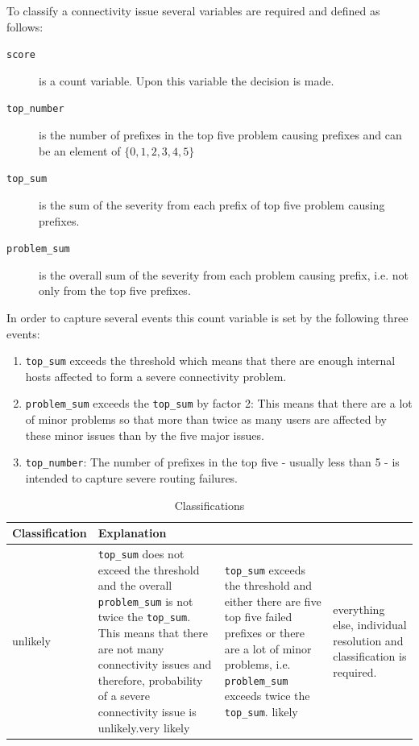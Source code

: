 To classify a connectivity issue several variables are required and defined as
follows:
\begin{description}
	\item[\texttt{score}] is a count variable. Upon this
	variable the decision is made.
	\item[\texttt{top\_number}] is the number of prefixes in the top five problem
	causing prefixes and can be an element of $\{0,1,2,3,4,5\}$
	\item[\texttt{top\_sum}] is the sum of the severity from each prefix of top five
	problem causing prefixes.
	\item[\texttt{problem\_sum}] is the overall sum of the severity from each
	problem causing prefix, i.e. not only from the top five prefixes.
\end{description}
In order to capture several events this count variable is set
by the following three events:
\begin{enumerate}
	\item \texttt{top\_sum} exceeds the threshold which means that
	there are enough internal hosts affected to form a severe connectivity problem.
	\item \texttt{problem\_sum} exceeds the \texttt{top\_sum} by factor 2: This
	means that there are a lot of minor problems so that more than twice as many
	users are affected by these minor issues than by the five major issues.
	\item \texttt{top\_number}: The number of prefixes in the top five - usually
	less than 5 - is intended to capture severe routing failures.
\end{enumerate}
\begin{table}
	[ht!] 
	\begin{center}
		\begin{tabular}
			{|l|p{12cm}|}
			\hline \textbf{Classification} & \textbf{Explanation}\\
			\hline\hline unlikely &
			\texttt{top\_sum} does not exceed the threshold and the overall
			\texttt{problem\_sum} is not twice the \texttt{top\_sum}. This means that there
			are not many connectivity issues and therefore, probability of a severe
			connectivity issue is unlikely.\cr \hline very likely & \texttt{top\_sum}
			exceeds the threshold and either there are five top five failed prefixes or
			there are a lot of minor problems, i.e. \texttt{problem\_sum} exceeds twice the
			\texttt{top\_sum}. \cr \hline likely & everything else, individual resolution
			and classification is required. \\
			\hline 
		\end{tabular}
		
		\caption{Classifications} 
		\label{tab:classification} 
	\end{center}
\end{table}

